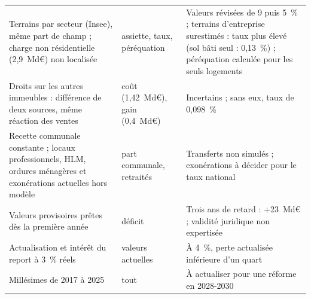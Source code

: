 \begin{table}[!htbp]
\begin{tabularx}{\linewidth}{@{}>{\raggedright\arraybackslash}p{4.3cm}>{\raggedright\arraybackslash}p{2.4cm}>{\raggedright\arraybackslash}X@{}}
Terrains par secteur (Insee), même part de champ ; charge non résidentielle (2,9~Md€) non localisée & assiette, taux, péréquation & Valeurs révisées de 9 puis 5~\% ; terrains d'entreprise surestimés : taux plus élevé (sol bâti seul : 0,13~\%) ; péréquation calculée pour les seuls logements \\
Droits sur les autres immeubles : différence de deux sources, même réaction des ventes & coût (1,42~Md€), gain (0,4~Md€) & Incertains ; sans eux, taux de 0,098~\% \\
Recette communale constante ; locaux professionnels, HLM, ordures ménagères et exonérations actuelles hors modèle & part communale, retraités & Transferts non simulés ; exonérations à décider pour le taux national \\
Valeurs provisoires prêtes dès la première année & déficit & Trois ans de retard : +23~Md€ ; validité juridique non expertisée \\
Actualisation et intérêt du report à 3~\% réels & valeurs actuelles & À 4~\%, perte actualisée inférieure d'un quart \\
Millésimes de 2017 à 2025 & tout & À actualiser pour une réforme en 2028-2030 \\
\bottomrule
\end{tabularx}
\end{table}

